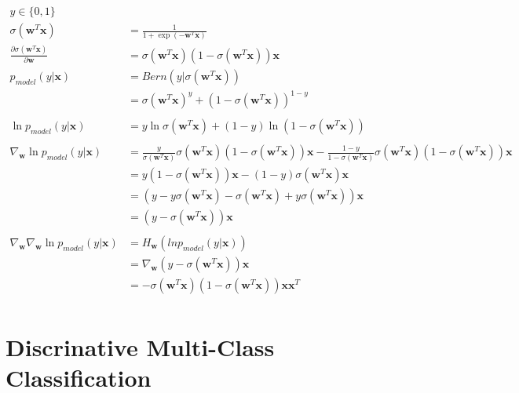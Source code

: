 \documentclass[a4]{article}
\begin{document}
\begin{equation}
\begin{aligned}
y \in \{0,1\}\\
\sigma(\bm{w}^T\bm{x}) &= \frac{1}{1 + \exp(-\bm{w}^T\bm{x})}\\
\frac{\partial\sigma(\bm{w}^T\bm{x})}{\partial\bm{w}}
&= \sigma(\bm{w}^T\bm{x}) (1 - \sigma(\bm{w}^T\bm{x}))\bm{x}\\
p_{model}(y|\bm{x}) &= Bern\left(y|\sigma(\bm{w}^T\bm{x})\right)\\
&= \sigma(\bm{w}^T\bm{x})^y + (1 - \sigma(\bm{w}^T\bm{x}))^{1 -y}\\
\\
\ln p_{model}(y|\bm{x}) &=
y \ln\sigma(\bm{w}^T\bm{x}) + (1-y)\ln(1 - \sigma(\bm{w}^T\bm{x}))\\
\\
\nabla_{\bm{w}}\ln p_{model}(y|\bm{x}) 
&= \frac{y}{\sigma(\bm{w}^T\bm{x})}
\sigma(\bm{w}^T\bm{x})(1-\sigma(\bm{w}^T\bm{x}))\bm{x}
- \frac{1-y}{1 - \sigma(\bm{w}^T\bm{x})}
\sigma(\bm{w}^T\bm{x})(1-\sigma(\bm{w}^T\bm{x}))\bm{x}\\
&= y(1 - \sigma(\bm{w}^T\bm{x}))\bm{x} - (1-y)\sigma(\bm{w}^T\bm{x})\bm{x}\\
&= (y - y\sigma(\bm{w}^T\bm{x}) - 
    \sigma(\bm{w}^T\bm{x}) + y\sigma(\bm{w}^T\bm{x}))\bm{x}\\
&= (y - \sigma(\bm{w}^T\bm{x}))\bm{x}\\
\\
\nabla_{\bm{w}}\nabla_{\bm{w}}\ln p_{model}(y|\bm{x}) 
&= H_{\bm{w}}\left(ln p_{model}(y|\bm{x}) \right)\\
&= \nabla_{\bm{w}}(y - \sigma(\bm{w}^T\bm{x}))\bm{x}\\
&= - \sigma(\bm{w}^T\bm{x})(1 - \sigma(\bm{w}^T\bm{x}))\bm{x}\bm{x}^T\\
\end{aligned}
\end{equation}

\section{Discrinative Multi-Class Classification}
\end{document}
